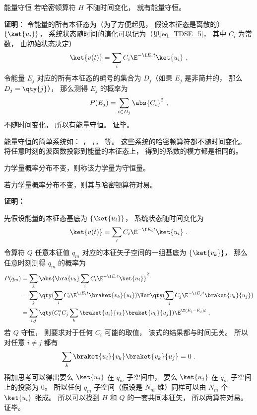 \begin{theorem}{能量守恒}
若哈密顿算符 $H$ 不随时间变化， 就有能量守恒。
\end{theorem}
\textbf{证明}： 令能量的所有本征态为（为了方便起见， 假设本征态是离散的） $\{\ket{u_i}\}$， 系统状态随时间的演化可以记为（见\autoref{eq_TDSE_5}， 其中 $C_i$ 为常数， 由初始状态决定）
\begin{equation}
\ket{v(t)} = \sum_i C_i \E^{-\I E_i t} \ket{u_i}~,
\end{equation}
令能量 $E_j$ 对应的所有本征态的编号的集合为 $D_j$（如果 $E_j$ 是非简并的， 那么 $D_j = \qty{j}$），%
那么测得 $E_j$ 的概率为
\begin{equation}
P(E_j) = \sum_{i \in D_j} \abs{C_i}^2~,
\end{equation}
不随时间变化， 所以有能量守恒。 证毕。

\begin{example}{}
能量守恒的简单系统如： ， ，， 等。 这些系统的哈密顿算符都不随时间变化。 将任意时刻的波函数投影到能量的本征态上， 得到的系数的模方都是相同的。
\end{example}

\begin{definition}{}
力学量概率分布不变，则称该力学量为守恒量。
\end{definition}
\begin{corollary}{}
若力学量概率分布不变，则其与哈密顿算符对易。
\end{corollary}
\textbf{证明：}

先假设能量的本征态基底为 $\{\ket{u_i}\}$， 系统状态随时间变化为
\begin{equation}
\ket{v(t)} = \sum_i C_i \E^{-\I E_i t} \ket{u_i}~.
\end{equation}
令算符 $Q$ 任意本征值 $q_m$ 对应的本征矢子空间的一组基底为 $\{\ket{v_k}\}$， 那么任意时刻测得 $q_m$ 的概率为
\begin{equation}
\begin{aligned}
P(q_m) &= \sum_k \abs{\bra{v_k} \sum_i C_i \E^{-\I E_i t} \ket{u_i}}^2\\
&= \sum_k \qty(\sum_i C_i \E^{\I E_i t} \braket{v_k}{u_i})\Her \qty(\sum_j C_j \E^{-\I E_j t} \braket{v_k}{u_j})\\
&= \sum_{i,j} \qty( C_i^* C_j \sum_k \braket{u_i}{v_k} \braket{v_k}{u_j}) \E^{\I (E_i - E_j) t}~,
\end{aligned}
\end{equation}
若 $Q$ 守恒， 则要求对于任何 $C_i$ 可能的取值， 该式的结果都与时间无关。 所以对任意 $i \ne j$ 都有
\begin{equation}
\sum_k \braket{u_i}{v_k} \braket{v_k}{u_j} = 0~.
\end{equation}
稍加思考可以得出要么 $\ket{u_j}$ 在 $q_m$ 子空间中， 要么 $\ket{u_j}$ 在 $q_m$ 子空间上的投影为 0。 所以任何 $q_m$ 子空间（假设是 $N_m$ 维）同样可以由 $N_m$ 个 $\ket{u_i}$ 张成。 所以可以找到 $H$ 和 $Q$ 的一套共同本征矢， 所以两算符对易。 证毕。